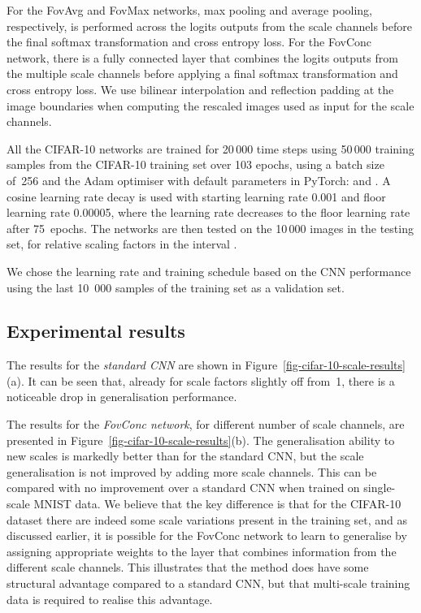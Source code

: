 \documentclass[twocolumn,runningheads]{svjour3}
\begin{document}
For the FovAvg and FovMax networks, max pooling and average
pooling, respectively, is performed across the logits outputs from the scale channels before the final softmax transformation and cross entropy loss.
For the FovConc network, there is a fully connected layer that combines the logits outputs from the multiple scale channels before applying a final softmax transformation and cross entropy loss.
We use bilinear interpolation and reflection padding at the image boundaries when computing the rescaled images used as input for the scale channels.

All the CIFAR-10 networks are trained for 20\,000 time steps using 50\,000 training samples from the CIFAR-10 training set over
103 epochs, using a batch size of~256 and the Adam optimiser
with default parameters in PyTorch:  and .
A cosine learning rate decay is used with
starting learning rate 0.001 and floor learning rate 0.00005,
where the learning rate decreases to the floor learning rate after 75~epochs.
The networks are then tested
on the 10\,000 images in the testing set, for relative scaling
factors in the interval .

We chose the learning rate and training schedule based on the CNN performance using the last
10\, 000 samples of the training set as a validation set.

\subsection{Experimental results}

The results for the {\em standard CNN\/} are shown in Figure~\ref{fig-cifar-10-scale-results}(a).
It can be seen that, already for scale factors slightly off from~1,
there is a noticeable drop in generalisation performance.

The results for the {\em FovConc network\/}, for different number of
scale channels, are presented in Figure~\ref{fig-cifar-10-scale-results}(b).
The generalisation ability to new scales is markedly better than for the
standard CNN, but the scale generalisation is not improved by
adding more scale channels. This can be compared with no improvement over a standard CNN when trained on single-scale MNIST data. We believe that the key difference is that for the CIFAR-10 dataset there are
indeed some scale variations present in the training set, and as
discussed earlier, it is possible for the FovConc network to learn to generalise by assigning appropriate weights to the layer that combines
information from the different scale channels. This illustrates that the method does have some structural advantage compared to a standard CNN,
but that multi-scale training data is required to realise this advantage. 
\end{document}
